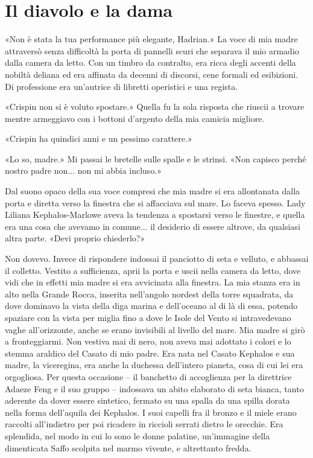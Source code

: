 \chapter{Il diavolo e la dama}

«Non è stata la tua performance più elegante, Hadrian.» La voce di mia
madre attraversò senza difficoltà la porta di pannelli scuri che
separava il mio armadio dalla camera da letto. Con un timbro da
contralto, era ricca degli accenti della nobiltà deliana ed era affinata
da decenni di discorsi, cene formali ed esibizioni. Di professione era
un'autrice di libretti operistici e una regista.

«Crispin non si è voluto spostare.» Quella fu la sola risposta che
riuscii a trovare mentre armeggiavo con i bottoni d'argento della mia
camicia migliore.

«Crispin ha quindici anni e un pessimo carattere.»

«Lo so, madre.» Mi passai le bretelle sulle spalle e le strinsi. «Non
capisco perché nostro padre non... non mi abbia incluso.»

Dal suono opaco della sua voce compresi che mia madre si era allontanata
dalla porta e diretta verso la finestra che si affacciava sul mare. Lo
faceva spesso. Lady Liliana Kephalos-Marlowe aveva la tendenza a
spostarsi verso le finestre, e quella era una cosa che avevamo in
comune... il desiderio di essere altrove, da qualsiasi altra parte.
«Devi proprio chiederlo?»

Non dovevo. Invece di rispondere indossai il panciotto di seta e
velluto, e abbassai il colletto. Vestito a sufficienza, aprii la porta e
uscii nella camera da letto, dove vidi che in effetti mia madre si era
avvicinata alla finestra. La mia stanza era in alto nella Grande Rocca,
inserita nell'angolo nordest della torre squadrata, da dove dominavo la
vista della diga marina e dell'oceano al di là di essa, potendo spaziare
con la vista per miglia fino a dove le Isole del Vento si intravedevano
vaghe all'orizzonte, anche se erano invisibili al livello del mare. Mia
madre si girò a fronteggiarmi. Non vestiva mai di nero, non aveva mai
adottato i colori e lo stemma araldico del Casato di mio padre. Era nata
nel Casato Kephalos e sua madre, la viceregina, era anche la duchessa
dell'intero pianeta, cosa di cui lei era orgogliosa. Per questa
occasione -- il banchetto di accoglienza per la direttrice Adaeze Feng e
il suo gruppo -- indossava un abito elaborato di seta bianca, tanto
aderente da dover essere sintetico, fermato su una spalla da una spilla
dorata nella forma dell'aquila dei Kephalos. I suoi capelli fra il
bronzo e il miele erano raccolti all'indietro per poi ricadere in
riccioli serrati dietro le orecchie. Era splendida, nel modo in cui lo
sono le donne palatine, un'immagine della dimenticata Saffo scolpita nel
marmo vivente, e altrettanto fredda.

